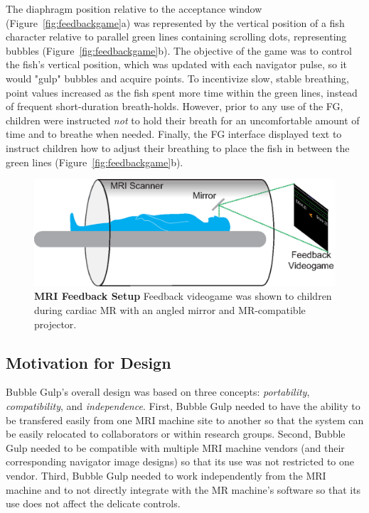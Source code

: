 	The diaphragm position relative to the acceptance window (Figure~\ref{fig:feedbackgame}a) was represented by the vertical position of a fish character relative to parallel green lines containing scrolling dots, representing bubbles (Figure~\ref{fig:feedbackgame}b). The objective of the game was to control the fish's vertical position, which was updated with each navigator pulse, so it would "gulp" bubbles and acquire points. To incentivize slow, stable breathing, point values increased as the fish spent more time within the green lines, instead of frequent short-duration breath-holds. However, prior to any use of the FG, children were instructed \textit{not} to hold their breath for an uncomfortable amount of time and to breathe when needed. Finally, the FG interface displayed text to instruct children how to adjust their breathing to place the fish in between the green lines (Figure~\ref{fig:feedbackgame}b).
	
	\begin{figure} 
		\includegraphics{figures/gamepaper/02-feedback_videogame_in_mri}
		\caption[MRI Feedback Setup]{\textbf{MRI Feedback Setup} Feedback videogame was shown to children during cardiac MR with an angled mirror and MR-compatible projector.}
		\label{fig:MRI_feedback}
	\end{figure}

\subsection{Motivation for Design}
	Bubble Gulp's overall design was based on three concepts: \textit{portability}, \textit{compatibility}, and \textit{independence}. First, Bubble Gulp needed to have the ability to be transfered easily from one MRI machine site to another so that the system can be easily relocated to collaborators or within research groups. Second, Bubble Gulp needed to be compatible with multiple MRI machine vendors (and their corresponding navigator image designs) so that its use was not restricted to one vendor. Third, Bubble Gulp needed to work independently from the MRI machine and to not directly integrate with the MR machine's software so that its use does not affect the delicate controls.

